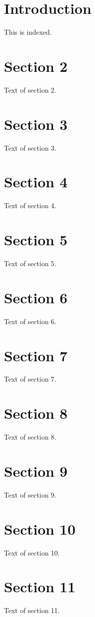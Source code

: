 \documentclass{article}
\begin{document}
\tableofcontents
\clearpage
\section{Introduction}
This is indexed.
\section{Section 2}
Text of section 2.

\section{Section 3}
Text of section 3.

\section{Section 4}
Text of section 4.

\section{Section 5}
Text of section 5.

\section{Section 6}
Text of section 6.

\section{Section 7}
Text of section 7.

\section{Section 8}
Text of section 8.

\section{Section 9}
Text of section 9.

\section{Section 10}
Text of section 10.

\section{Section 11}
Text of section 11.
\end{document}
